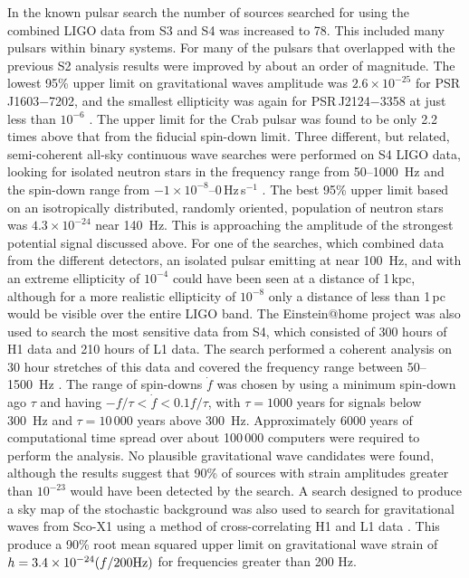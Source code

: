 \documentclass{article}
\begin{document}
In the known pulsar search the number of sources searched for using the combined
LIGO data from S3 and S4 was increased to 78. This included many pulsars within
binary systems. For many of the pulsars that overlapped with the previous S2
analysis results were improved by about an order of magnitude. The lowest 95\%
upper limit on gravitational waves amplitude was $2.6\times10^{-25}$ for
PSR\,J1603$-$7202, and the smallest ellipticity was again for PSR\,J2124$-$3358
at just less than $10^{-6}$ \cite{Abbott:2007d}. The upper limit for the Crab
pulsar was found to be only 2.2 times above that from the fiducial spin-down
limit. Three different, but related, semi-coherent all-sky continuous
wave searches were performed on S4 LIGO data, looking for isolated neutron stars
in the frequency range from 50--1000~Hz and the spin-down range from
$-1\times10^{-8}$--0\,Hz\,s$^{-1}$ \cite{Abbott:2008e}. The best 95\% upper
limit based on an isotropically distributed, randomly oriented, population of
neutron stars was $4.3\times10^{-24}$ near 140~Hz. This is approaching the
amplitude of the strongest potential signal discussed above. For one of the
searches, which combined data from the different detectors, an isolated pulsar
emitting at near 100~Hz, and with an extreme ellipticity of $10^{-4}$ could
have been seen at a distance of 1\,kpc, although for a more realistic
ellipticity of $10^{-8}$ only a distance of less than 1\,pc would be visible
over the entire LIGO band. The Einstein@home project \cite{eath} was also used
to search the most sensitive data from S4, which consisted of 300 hours of H1
data and 210 hours of L1 data. The search performed a coherent analysis on 30
hour stretches of this data and covered the frequency range between
50--1500~Hz \cite{Abbott:2008f}. The range of spin-downs $\dot{f}$ was chosen
by using a minimum spin-down ago $\tau$ and having $-f/\tau < \dot{f} <
0.1f/\tau$, with $\tau = 1000$ years for signals below 300~Hz and $\tau = 10\,000$
years above 300~Hz. Approximately 6000 years of computational time spread over
about 100\,000 computers were required to perform the analysis. No plausible
gravitational wave candidates were found, although the results suggest that 90\%
of sources with strain amplitudes greater than $10^{-23}$ would have been
detected by the search. A search designed to produce a sky map of the
stochastic background was also used to search for gravitational waves from
Sco-X1 using a method of cross-correlating H1 and L1 data \cite{Abbott:2007f}.
This produce a 90\% root mean squared upper limit on gravitational wave strain
of $h = 3.4\times10^{-24}(f/200 {\rm Hz})$ for frequencies greater than 200 Hz.
\end{document}
